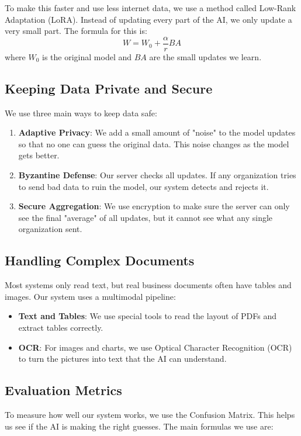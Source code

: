 \documentclass[acmsmall,screen]{acmart}
\begin{document}
To make this faster and use less internet data, we use a method called Low-Rank Adaptation (LoRA). Instead of updating every part of the AI, we only update a very small part. The formula for this is:
\begin{equation}
W = W_0 + \frac{\alpha}{r} BA
\end{equation}
where $W_0$ is the original model and $BA$ are the small updates we learn.

\subsection{Keeping Data Private and Secure}
We use three main ways to keep data safe:
\begin{enumerate}
    \item \textbf{Adaptive Privacy}: We add a small amount of "noise" to the model updates so that no one can guess the original data. This noise changes as the model gets better.
    \item \textbf{Byzantine Defense}: Our server checks all updates. If any organization tries to send bad data to ruin the model, our system detects and rejects it.
    \item \textbf{Secure Aggregation}: We use encryption to make sure the server can only see the final "average" of all updates, but it cannot see what any single organization sent.
\end{enumerate}

\subsection{Handling Complex Documents}
Most systems only read text, but real business documents often have tables and images. Our system uses a multimodal pipeline:
\begin{itemize}
    \item \textbf{Text and Tables}: We use special tools to read the layout of PDFs and extract tables correctly.
    \item \textbf{OCR}: For images and charts, we use Optical Character Recognition (OCR) to turn the pictures into text that the AI can understand.
\end{itemize}

\subsection{Evaluation Metrics}
To measure how well our system works, we use the Confusion Matrix. This helps us see if the AI is making the right guesses. The main formulas we use are:
\end{document}
